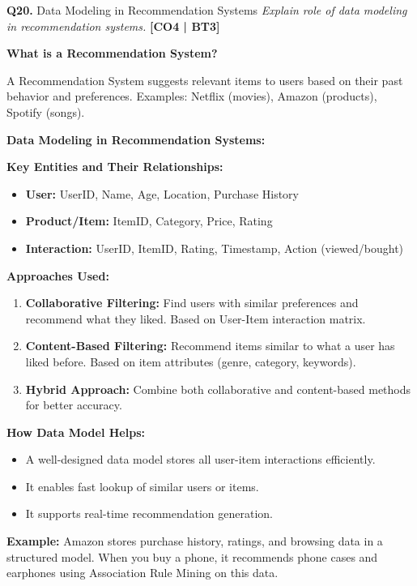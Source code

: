 \documentclass[12pt,a4paper]{article}
\newcommand{\Qno}[1]{\textbf{\color{darkred}Q#1.}}
\newcommand{\term}[1]{\textbf{\color{headingcolor}#1}}
\begin{document}
\vspace{8pt}

\begin{questionbox}{\Qno{20} Data Modeling in Recommendation Systems}
\textit{Explain role of data modeling in recommendation systems.} \hfill \textbf{[CO4 | BT3]}
\end{questionbox}

\begin{answerenv}

\textbf{\color{headingcolor}What is a Recommendation System?}

A Recommendation System suggests relevant items to users based on their past behavior and preferences. Examples: Netflix (movies), Amazon (products), Spotify (songs).

\vspace{6pt}
\textbf{\color{headingcolor}Data Modeling in Recommendation Systems:}

\textbf{Key Entities and Their Relationships:}
\begin{itemize}[leftmargin=1.5em, itemsep=2pt]
  \item \term{User:} UserID, Name, Age, Location, Purchase History
  \item \term{Product/Item:} ItemID, Category, Price, Rating
  \item \term{Interaction:} UserID, ItemID, Rating, Timestamp, Action (viewed/bought)
\end{itemize}

\textbf{\color{headingcolor}Approaches Used:}
\begin{enumerate}[leftmargin=1.8em, itemsep=4pt]
  \item \term{Collaborative Filtering:} Find users with similar preferences and recommend what they liked. Based on User-Item interaction matrix.
  \item \term{Content-Based Filtering:} Recommend items similar to what a user has liked before. Based on item attributes (genre, category, keywords).
  \item \term{Hybrid Approach:} Combine both collaborative and content-based methods for better accuracy.
\end{enumerate}

\textbf{\color{headingcolor}How Data Model Helps:}
\begin{itemize}[leftmargin=1.5em, itemsep=2pt]
  \item A well-designed data model stores all user-item interactions efficiently.
  \item It enables fast lookup of similar users or items.
  \item It supports real-time recommendation generation.
\end{itemize}

\begin{keypoint}
\textbf{Example:} Amazon stores purchase history, ratings, and browsing data in a structured model. When you buy a phone, it recommends phone cases and earphones using Association Rule Mining on this data.
\end{keypoint}

\end{answerenv}
\end{document}
